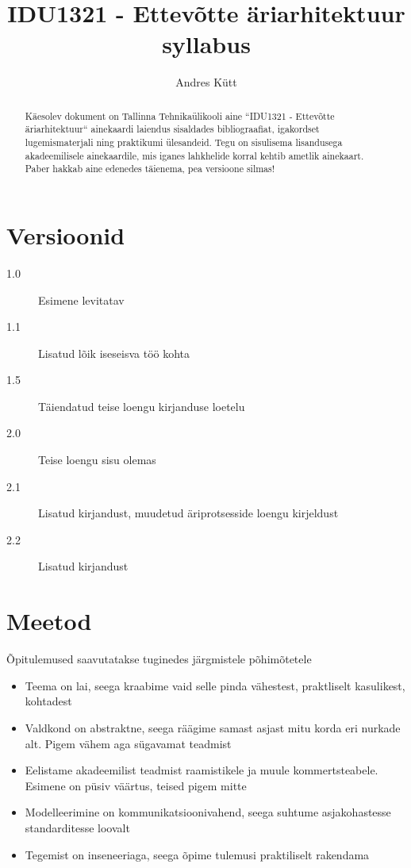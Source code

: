 \documentclass[nobib]{tufte-handout}
\title{IDU1321 - Ettevõtte äriarhitektuur syllabus}
\author[Andres Kütt]{Andres Kütt}
\begin{document}
\maketitle
\begin{abstract}
\noindent
Käesolev dokument on Tallinna Tehnikaülikooli aine ``IDU1321 - Ettevõtte äriarhitektuur`` ainekaardi laiendus sisaldades bibliograafiat, igakordset lugemismaterjali ning praktikumi ülesandeid. Tegu on sisulisema lisandusega akadeemilisele ainekaardile, mis iganes lahkhelide korral kehtib ametlik ainekaart. Paber hakkab aine edenedes täienema, pea versioone silmas!
\end{abstract}

\section{Versioonid}
\begin{description}
	\item[1.0] Esimene levitatav 
	\item[1.1] Lisatud lõik iseseisva töö kohta
	\item[1.5] Täiendatud teise loengu kirjanduse loetelu
	\item[2.0] Teise loengu sisu olemas
	\item[2.1] Lisatud kirjandust, muudetud äriprotsesside loengu kirjeldust
	\item[2.2] Lisatud kirjandust
\end{description}

\section{Meetod}
Õpitulemused saavutatakse tuginedes järgmistele põhimõtetele
\begin{itemize}
	\item Teema on lai, seega kraabime vaid selle pinda vähestest, praktliselt kasulikest, kohtadest
	\item Valdkond on abstraktne, seega räägime samast asjast mitu korda eri nurkade alt. Pigem vähem aga sügavamat teadmist
	\item Eelistame akadeemilist teadmist raamistikele ja muule kommertsteabele. Esimene on püsiv väärtus, teised pigem mitte
	\item Modelleerimine on kommunikatsioonivahend, seega suhtume asjakohastesse standarditesse loovalt
	\item Tegemist on inseneeriaga, seega õpime tulemusi praktiliselt rakendama
\end{itemize}
\end{document}
